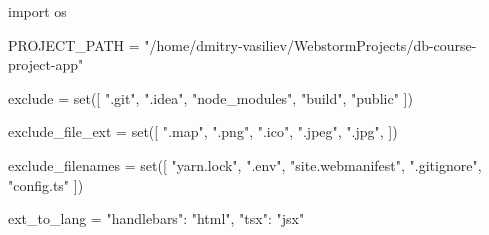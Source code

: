 \begin{pycode}
import os

PROJECT_PATH = "/home/dmitry-vasiliev/WebstormProjects/db-course-project-app"

exclude = set([
    ".git",
    ".idea",
    "node_modules",
    "build",
    "public"
])

exclude_file_ext = set([
    ".map",
    ".png",
    ".ico",
    ".jpeg",
    ".jpg",
])

exclude_filenames = set([
    "yarn.lock",
    ".env",
    "site.webmanifest",
    ".gitignore",
    "config.ts"
])

ext_to_lang = {
    "handlebars": "html",
    "tsx": "jsx"
}
\end{pycode}